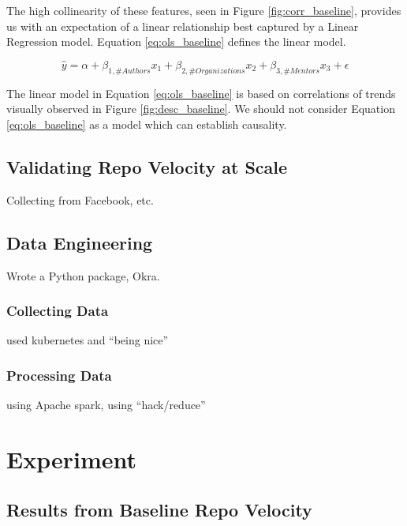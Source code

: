 \documentclass{article}
\begin{document}
The high collinearity of these features, seen in Figure
\ref{fig:corr_baseline}, provides us with an expectation of a linear
relationship best captured by a Linear Regression model. Equation
\ref{eq:ols_baseline} defines the linear model.

\begin{equation}
  \label{eq:ols_baseline}
  \hat{y} = \alpha + \beta_{1, \# Authors}x_1 + \beta_{2, \# Organizations}
  x_2 + \beta_{3, \# Mentors}x_3 + \epsilon
\end{equation}

The linear model in Equation \ref{eq:ols_baseline} is based on correlations
of trends visually observed in Figure \ref{fig:desc_baseline}. We should
not consider Equation \ref{eq:ols_baseline} as a model which can establish
causality.

\subsection{Validating Repo Velocity at Scale}



Collecting from Facebook, etc.

\subsection{Data Engineering}

Wrote a Python package, Okra.

\subsubsection{Collecting Data}

used kubernetes and ``being nice''

\subsubsection{Processing Data}

using Apache spark, using ``hack/reduce''

\section{Experiment}

\subsection{Results from Baseline Repo Velocity}
\end{document}
